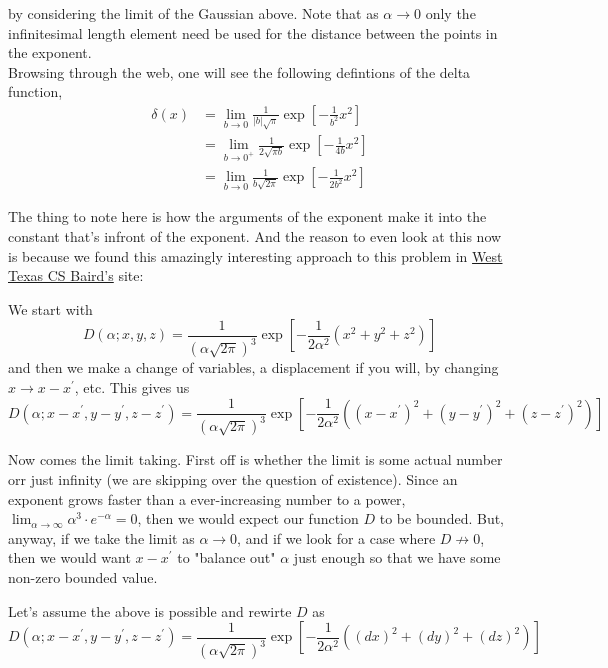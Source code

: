 by considering the limit of the Gaussian above.
Note that as $\alpha \rightarrow 0$ only the infinitesimal length
element need be used for the distance between the points in the exponent.
\\

Browsing through the web, one will see the following defintions of the delta function,
\begin{align*}
\delta (x) &= \lim_{b\rightarrow 0} \frac{1}{|b|\sqrt{\pi}} \exp{ \left[ -\frac{1}{b^2} x^2 \right]} \\
    &= \lim_{b\rightarrow 0^+} \frac{1}{2\sqrt{\pi b}} \exp{ \left[ -\frac{1}{4b} x^2 \right]} \\
    &= \lim_{b\rightarrow 0} \frac{1}{b \sqrt{2\pi}} \exp{ \left[ -\frac{1}{2b^2} x^2 \right]}
\end{align*}

The thing to note here is how the arguments of the exponent make it into the constant that's infront of the exponent.
And the reason to even look at this now is because we found this amazingly interesting approach to this problem in
\href{https://www.wtamu.edu/~cbaird/courses.html}{West Texas CS Baird's} site:

We start with
$$
D\left(\alpha ; x, y, z \right) =
    \frac{1}{\left(\alpha \sqrt{2\pi}\right)^3}
    \exp{ \left[ -\frac{1}{2\alpha^2} \left( x^2 + y^2 + z^2 \right) \right] }
$$
and then we make a change of variables, a displacement if you will, by changing $x \rightarrow x - x^\prime$, etc.
This gives us
$$
D\left(\alpha ; x-x^\prime, y-y^\prime, z-z^\prime \right) =
    \frac{1}{\left(\alpha \sqrt{2\pi}\right)^3}
    \exp{ \left[ -\frac{1}{2\alpha^2} \left( (x-x^\prime)^2 + (y-y^\prime)^2 + (z-z^\prime)^2 \right) \right] }
$$

Now comes the limit taking.
First off is whether the limit is some actual number orr just infinity (we are skipping over the question of existence).
Since an exponent grows faster than a ever-increasing number to a power,
$\lim_{\alpha\rightarrow \infty} \alpha^3 \cdot e^{-\alpha} = 0$,
then we would expect our function $D$ to be bounded.
But, anyway, if we take the limit as $\alpha\rightarrow 0$, and if we look for a case where $D\not\rightarrow 0$,
then we would want $x-x^\prime$ to "balance out" $\alpha$ just enough so that we have some non-zero bounded value.

Let's assume the above is possible and rewirte $D$ as
$$
D\left(\alpha ; x-x^\prime, y-y^\prime, z-z^\prime \right) =
    \frac{1}{\left(\alpha \sqrt{2\pi}\right)^3}
    \exp{ \left[ -\frac{1}{2\alpha^2} \left( (dx)^2 + (dy)^2 + (dz)^2 \right) \right] }
$$

